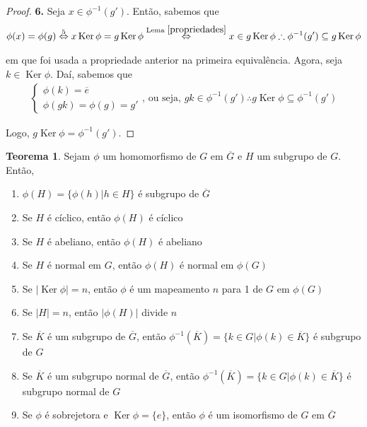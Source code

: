 \documentclass[a4paper,portuguese,11pt,twoside, leqno]{book}
\DeclareMathOperator{\Ker}{Ker}
\theoremstyle{definition}
\newtheorem{theorem}{Teorema}[section]
\begin{document}
\begin{proof}
		\par\vspace{0.3cm}\hspace{17pt}\textbf{6.} Seja $x\in\phi^{-1}(g')$. Então, sabemos que
		\begin{align*}
		\phi(x) = \phi(g) \overset{5}{\Leftrightarrow} x\Ker\phi = g\Ker\phi \overset{\text{Lema }\eqref{propriedades}}{\Leftrightarrow} x\in g\Ker\phi \therefore \phi^{-1}(g') \subseteq g\Ker\phi
		\end{align*}
		
		\par\vspace{0.3cm} em que foi usada a propriedade anterior na primeira equivalência. Agora, seja $k\in\Ker\phi$. Daí, sabemos que
		\begin{align*}
		\begin{cases} \phi(k) = \overline{e} \\ 
		\phi(gk) = \phi(g) = g'
		\end{cases} \text{, ou seja, $gk\in \phi^{-1}(g')$}\therefore g\Ker\phi \subseteq \phi^{-1}(g')
		\end{align*}
		
		\par\vspace{0.3cm} Logo, $g\Ker\phi = \phi^{-1}(g')$.
		
	\end{proof}
	
	\begin{theorem}
		\label{homomorfismos em subgrupos}
		Sejam $\phi$ um homomorfismo de $G$ em $\overline{G}$ e $H$ um subgrupo de $G$. Então,
		
		\begin{enumerate}
			\item $\phi(H) = \{ \phi(h) | h\in H \}$ é subgrupo de $\overline{G}$
			\item Se $H$ é cíclico, então $\phi(H)$ é cíclico
			\item Se $H$ é abeliano, então $\phi(H)$ é abeliano
			\item Se $H$ é normal em $G$, então $\phi(H)$ é normal em $\phi(G)$
			\item Se $|\Ker\phi| = n$, então $\phi$ é um mapeamento $n$ para 1 de $G$ em $\phi (G)$
			\item Se $|H| = n$, então $|\phi(H)|$ divide $n$
			\item Se $\overline{K}$ é um subgrupo de $\overline{G}$, então $\phi^{-1}(\overline{K}) = \{ k\in G | \phi(k)\in \overline{K} \}$ é subgrupo de $G$
			\item Se $\overline{K}$ é um subgrupo normal de $\overline{G}$, então $\phi^{-1}(\overline{K}) = \{ k\in G | \phi(k)\in \overline{K} \}$ é subgrupo normal de $G$
			\item Se $\phi$ é sobrejetora e $\Ker\phi = \{e\}$, então $\phi$ é um isomorfismo de $G$ em $\overline{G}$
		\end{enumerate}
		
	\end{theorem}
	
\end{document}
